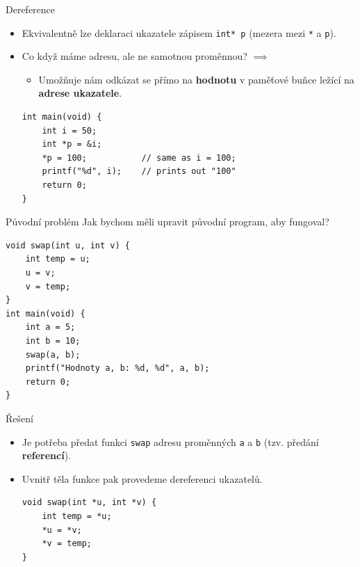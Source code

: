 \documentclass[14pt,aspectratio=169]{beamer}
\begin{document}
    \begin{frame}[t,fragile]{Dereference}
        \begin{itemize}
            \item Ekvivalentně lze deklaraci ukazatele zápisem \texttt{int* p} (mezera mezi \texttt{*} a \texttt{p}).
            \item Co když máme adresu, ale ne samotnou proměnnou? $\implies$ 
            \begin{itemize}
                \item Umožňuje nám odkázat se přímo na \textbf{hodnotu} v paměťové buňce ležící na \textbf{adrese ukazatele}.
            \end{itemize}
            \begin{lstlisting}
int main(void) {
    int i = 50;
    int *p = &i;
    *p = 100;           // same as i = 100;
    printf("%d", i);    // prints out "100"
    return 0;
}
            \end{lstlisting}
        \end{itemize}
    \end{frame}

    \begin{frame}[t,fragile]{Původní problém}
        Jak bychom měli upravit původní program, aby fungoval?
        \begin{lstlisting}
void swap(int u, int v) {
    int temp = u;
    u = v;
    v = temp;
}
int main(void) {
    int a = 5;
    int b = 10;
    swap(a, b);
    printf("Hodnoty a, b: %d, %d", a, b);
    return 0;
}
        \end{lstlisting}
    \end{frame}

    \begin{frame}[t,fragile]{Řešení}
        \begin{itemize}
            \item Je potřeba předat funkci \texttt{swap} adresu proměnných \texttt{a} a \texttt{b} (tzv. předání \textbf{referencí}).
            \item Uvnitř těla funkce pak provedeme dereferenci ukazatelů.
            \begin{lstlisting}
void swap(int *u, int *v) {
    int temp = *u;
    *u = *v;
    *v = temp;
}
            \end{lstlisting}
        \end{itemize}
    \end{frame}
\end{document}
